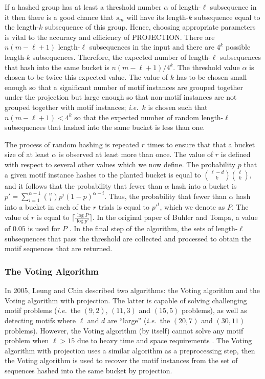 If a hashed group has at least a threshold number $\alpha$ of length-$\ell$ subsequence in it then there is a good chance that $s_m$ will have its length-$k$ subsequence equal to the length-$k$ subsequence of this group.  Hence, choosing appropriate parameters is vital to the accuracy and efficiency of PROJECTION.  There are $n(m - \ell + 1)$ length-$\ell$ subsequences in the input and there are $4^k$ possible length-$k$ subsequences.  Therefore, the expected number of length-$\ell$ subsequences that hash into the same bucket is $n(m - \ell + 1)/4^k$. The threshold value $\alpha$ is chosen to be twice this expected value. The value of $k$ has to be chosen small enough so that a significant number of motif instances are grouped together under the projection but large enough so that non-motif instances are not grouped together with motif instances; {\em i.e.}\ $k$ is chosen such that $n(m - \ell + 1) < 4^k$ so that the expected number of random length-$\ell$ subsequences that hashed into the same bucket is less than one. 

The process of random hashing is repeated $r$ times to ensure that that a bucket size of at least $\alpha$ is observed at least more than once.  The value of $r$ is defined with respect to several other values which we now define. The probability $p$ that a given motif instance hashes to the planted bucket is equal to ${{{\ell - d}\choose{k}}}{{\ell}\choose{k}}$, and it follows that the probability that fewer than $\alpha$ hash into a bucket is $p' = \sum_{i = 1}^{\alpha - 1} {n\choose i} p^i (1 - p)^{\alpha - i}$.  Thus, the probability that fewer than $\alpha$ hash into a bucket in each of the $r$ trials is equal to $p'^{t}$, which we denote as $P$.  The value of $r$ is equal to $\lceil \frac{\log P}{ \log p'}\rceil$.  In the original paper of Buhler and Tompa, a value of $0.05$ is used for $P$ \cite{BT02}.  In the final step of the algorithm, the sets of length-$\ell$ subsequences that pass the threshold are collected and processed to obtain the motif sequences that are returned.

\subsubsection{The Voting Algorithm}

In 2005, Leung and Chin \cite{CL05} described two algorithms: the Voting algorithm and the Voting algorithm with projection.  The latter is capable of solving challenging motif problems ({\em i.e.}\ the $(9, 2)$, $(11, 3)$ and $(15,5)$ problems), as well as detecting motifs where $\ell$ and $d$ are ``large'' ({\em i.e.}\ the $(20, 7)$ and $(30, 11)$ problems). However, the Voting algorithm (by itself) cannot solve any motif problem when $\ell > 15$ due to heavy time and space requirements \cite{CL05}.  The Voting algorithm with projection uses a similar algorithm as a preprocessing step, then the Voting algorithm is used to recover the motif instances from the set of sequences hashed into the same bucket by projection.  

